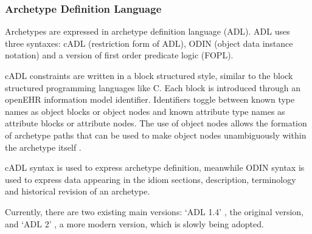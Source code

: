 \subsubsection{Archetype Definition Language}

Archetypes are expressed in archetype definition language \cite{openEHRADL} (ADL). ADL uses three syntaxes: cADL (restriction form of ADL), ODIN (object data instance notation) and a version of first order predicate logic (FOPL).

cADL constraints are written in a block structured style, similar to the block structured programming languages like C. Each block is introduced through an open\-EHR information model identifier. Identifiers toggle between known type names as object blocks or object nodes and known attribute type names as attribute blocks or attribute nodes. The use of object nodes allows the formation of archetype paths that can be used to make object nodes unambiguously within the archetype itself \cite{openEHRADL}.

cADL syntax is used to express archetype definition, meanwhile ODIN syntax is used to express data appearing in the idiom sections, description, terminology and historical revision of an archetype.

Currently, there are two existing main versions: `ADL 1.4' \cite{openEHRADL14}, the original version, and `ADL 2' \cite{openEHRADL}, a more modern version, which is slowly being adopted.
